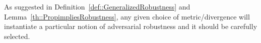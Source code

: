As suggested in Definition~\ref{def::GeneralizedRobustness} and Lemma~\ref{th::PropimpliesRobustness}, any given choice of metric/divergence will instantiate a particular notion of adversarial robustness and it should be carefully selected. %





